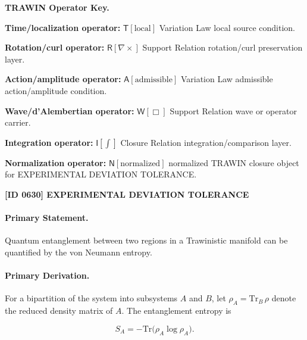 \par\vspace{0.45\baselineskip}
\noindent\begin{minipage}[t]{\linewidth}
\begingroup
\small
\raggedright
\textbf{TRAWIN Operator Key.}\par
\noindent\textbf{Time/localization operator:} $\mathsf{T}\!\left[\mathrm{local}\right]$ Variation Law local source condition.\par
\noindent\textbf{Rotation/curl operator:} $\mathsf{R}\!\left[\nabla\times\right]$ Support Relation rotation/curl preservation layer.\par
\noindent\textbf{Action/amplitude operator:} $\mathsf{A}\!\left[\mathrm{admissible}\right]$ Variation Law admissible action/amplitude condition.\par
\noindent\textbf{Wave/d'Alembertian operator:} $\mathsf{W}\!\left[\Box\right]$ Support Relation wave or operator carrier.\par
\noindent\textbf{Integration operator:} $\mathsf{I}\!\left[\int\right]$ Closure Relation integration/comparison layer.\par
\noindent\textbf{Normalization operator:} $\mathsf{N}\!\left[\mathrm{normalized}\right]$ normalized TRAWIN closure object for EXPERIMENTAL DEVIATION TOLERANCE.\par
\endgroup
\end{minipage}

\clearpage
\noindent\textbf{[ID 0630] EXPERIMENTAL DEVIATION TOLERANCE}\par
\vspace{0.35em}
\paragraph{Primary Statement.}

Quantum entanglement between two regions in a Trawinistic manifold can be quantified by the von Neumann entropy.

\paragraph{Primary Derivation.}

For a bipartition of the system into subsystems $A$ and $B$, let $\rho_A = \mathrm{Tr}_B\,\rho$ denote the reduced density matrix of $A$.  The entanglement entropy is

\begin{equation}
S_A = -\mathrm{Tr}\big( \rho_A\log\rho_A \big).
\end{equation}

